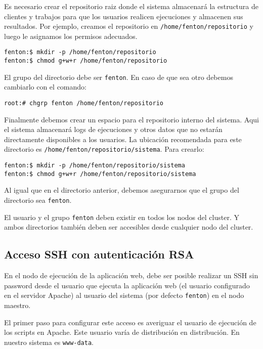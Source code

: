 \documentclass[a4paper,10pt,spanish]{article}
\begin{document}
Es necesario crear el repositorio raiz donde el sistema almacenar\'{a} la estructura de clientes y trabajos para que los usuarios realicen ejecuciones y almacenen sus resultados. Por ejemplo, creamos el repositorio en \mbox{\texttt{/home/fenton/repositorio}} y luego le asignamos los permisos adecuados.

\begin{verbatim}
fenton:$ mkdir -p /home/fenton/repositorio
fenton:$ chmod g+w+r /home/fenton/repositorio
\end{verbatim}

El grupo del directorio debe ser \mbox{\texttt{fenton}}. En caso de que sea otro debemos cambiarlo con el comando:

\begin{verbatim}
root:# chgrp fenton /home/fenton/repositorio
\end{verbatim}

Finalmente debemos crear un espacio para el repositorio interno del sistema. Aqui el sistema almacenar\'{a} logs de ejecuciones y otros datos que no estar\'{a}n directamente disponibles a los usuarios. La ubicaci\'{o}n recomendada para este directorio es \mbox{\texttt{/home/fenton/repositorio/sistema}}. Para crearlo:

\begin{verbatim}
fenton:$ mkdir -p /home/fenton/repositorio/sistema
fenton:$ chmod g+w+r /home/fenton/repositorio/sistema
\end{verbatim}

Al igual que en el directorio anterior, debemos asegurarnos que el grupo del directorio sea \mbox{\texttt{fenton}}.

El usuario y el grupo \mbox{\texttt{fenton}} deben existir en todos los nodos del cluster. Y ambos directorios tambi\'{e}n deben ser accesibles desde cualquier nodo del cluster.

\subsection{Acceso SSH con autenticaci\'{o}n RSA}

En el nodo de ejecuci\'{o}n de la aplicaci\'{o}n web, debe ser posible realizar un SSH sin password desde el usuario que ejecuta la aplicaci\'{o}n web (el usuario configurado en el servidor Apache) al usuario del sistema (por defecto \mbox{\texttt{fenton}}) en el nodo maestro. 

El primer paso para configurar este acceso es averiguar el usuario de ejecuci\'{o}n de los scripts en Apache. Este usuario var\'{i}a de distribuci\'{o}n en distribuci\'{o}n. En nuestro sistema es \mbox{\texttt{www-data}}.
\end{document}
